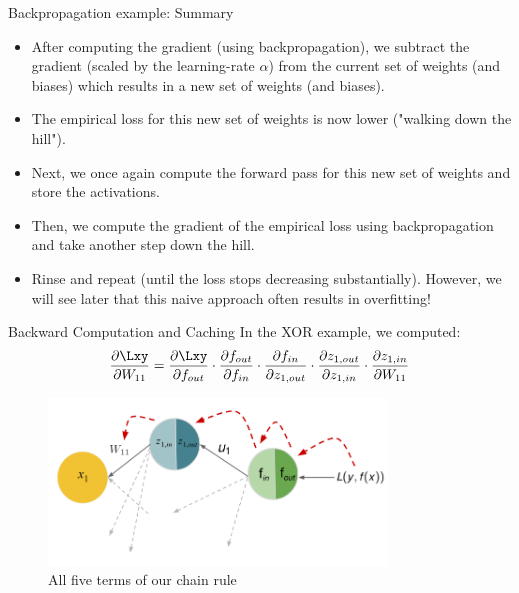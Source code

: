 \begin{frame} {Backpropagation example: Summary}
  \begin{itemize}
    \item After computing the gradient (using backpropagation), we subtract the gradient (scaled by the learning-rate $\alpha$) from the current set of weights (and biases) which results in a new set of weights (and biases).
    \item The empirical loss for this new set of weights is now lower ("walking down the hill").
    \item Next, we once again compute the forward pass for this new set of weights and store the activations.
    \item Then, we compute the gradient of the empirical loss using backpropagation and take another step down the hill.
    \item Rinse and repeat (until the loss stops decreasing substantially). 
      However, we will see later that this naive approach often results in overfitting!
  \end{itemize}
\end{frame}



\begin{frame} {Backward Computation and Caching}
    In the XOR example, we computed:
    $$\frac{\partial \Lxy}{\partial W_{11}} = 
        \frac{\partial \Lxy}{\partial f_{out}} \cdot  \textcolor{black}{\frac{\partial f_{out}}{\partial f_{in}}} \cdot  \textcolor{black}{\frac{\partial f_{in}}{\partial z_{1,out}}} \cdot  \textcolor{black}{\frac{\partial z_{1,out}}{\partial z_{1,in}}} \cdot  \textcolor{black}{\frac{\partial z_{1,in}}{\partial W_{11}}} $$
  \begin{figure}
    \centering
      \includegraphics[width=9cm]{figure/backprop_gg1_new.png}
      \caption{All five terms of our chain rule}
  \end{figure}
\end{frame}

